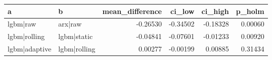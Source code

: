 \begin{tabular}{llrrrr}
\toprule
a & b & mean\_difference & ci\_low & ci\_high & p\_holm \\
\midrule
lgbm|raw & arx|raw & -0.26530 & -0.34502 & -0.18328 & 0.00060 \\
lgbm|rolling & lgbm|static & -0.04841 & -0.07601 & -0.01233 & 0.00920 \\
lgbm|adaptive & lgbm|rolling & 0.00277 & -0.00199 & 0.00885 & 0.31434 \\
\bottomrule
\end{tabular}
